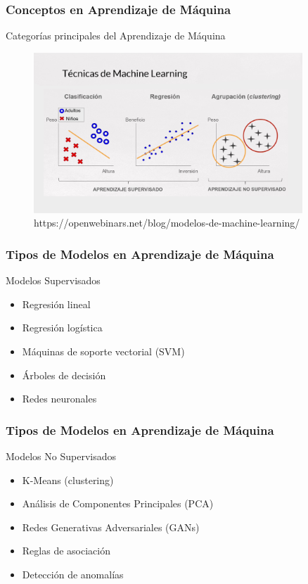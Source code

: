 \documentclass{beamer}
\begin{document}
\begin{frame}
	\frametitle{Conceptos en Aprendizaje de Máquina}
\begin{block}{Categorías principales del Aprendizaje de Máquina}	
\begin{figure}
	\includegraphics[width=0.9\textwidth]{supervisado_nosupervisado.png}
	\caption{https://openwebinars.net/blog/modelos-de-machine-learning/}
\end{figure}
\end{block}
\end{frame}



\begin{frame}
	\frametitle{Tipos de Modelos en Aprendizaje de Máquina}
	
	\begin{block}{Modelos Supervisados}
	\begin{itemize}
		\item Regresión lineal
		\item Regresión logística
		\item Máquinas de soporte vectorial (SVM)
		\item Árboles de decisión
		\item Redes neuronales
	\end{itemize}
\end{block}

\end{frame}

	
\begin{frame}
	\frametitle{Tipos de Modelos en Aprendizaje de Máquina}
		\begin{block}{Modelos No Supervisados}
	\begin{itemize}
		\item K-Means (clustering)
		\item Análisis de Componentes Principales (PCA)
		\item Redes Generativas Adversariales (GANs)
		\item Reglas de asociación
		\item Detección de anomalías
	\end{itemize}
\end{block}
\end{frame}
	
\end{document}
